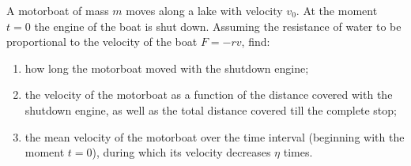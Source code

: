\item A motorboat of mass \( m \) moves along a lake with velocity \( v_0 \). At the moment \( t = 0 \) the engine of the boat is shut down. Assuming the resistance of water to be proportional to the velocity of the boat \( F = -rv \), find:
    \begin{enumerate}
        \item how long the motorboat moved with the shutdown engine;
        \item the velocity of the motorboat as a function of the distance covered with the shutdown engine, as well as the total distance covered till the complete stop;
        \item the mean velocity of the motorboat over the time interval (beginning with the moment \( t = 0 \)), during which its velocity decreases \( \eta \) times.
    \end{enumerate}\begin{solution}
    \begin{center}
    \end{center}
    

\end{solution}
